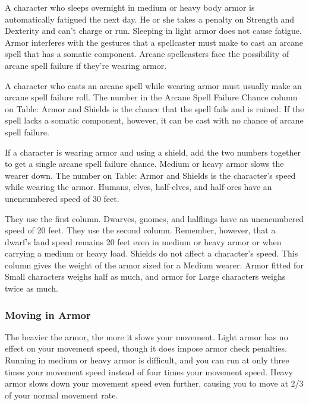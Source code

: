  A character who sleeps overnight in medium or heavy body armor is automatically fatigued the next day. He or she takes a  penalty on Strength and Dexterity and can't charge or run. Sleeping in light armor does not cause fatigue.
 Armor interferes with the gestures that a spellcaster must make to cast an arcane spell that has a somatic component. Arcane spellcasters face the possibility of arcane spell failure if they're wearing armor.

 A character who casts an arcane spell while wearing armor must usually make an arcane spell failure roll. The number in the Arcane Spell Failure Chance column on Table: Armor and Shields is the chance that the spell fails and is ruined. If the spell lacks a somatic component, however, it can be cast with no chance of arcane spell failure.

 If a character is wearing armor and using a shield, add the two numbers together to get a single arcane spell failure chance.
 Medium or heavy armor slows the wearer down. The number on Table: Armor and Shields is the character's speed while wearing the armor. Humans, elves, half-elves, and half-orcs have an unencumbered speed of 30 feet.
\par They use the first column. Dwarves, gnomes, and halflings have an unencumbered speed of 20 feet. They use the second column. Remember, however, that a dwarf's land speed remains 20 feet even in medium or heavy armor or when carrying a medium or heavy load.
 Shields do not affect a character's speed.
 This column gives the weight of the armor sized for a Medium wearer. Armor fitted for Small characters weighs half as much, and armor for Large characters weighs twice as much.

\subsubsection{Moving in Armor}
The heavier the armor, the more it slows your movement. Light armor has no effect on your movement speed, though it does impose armor check penalties. Running in medium or heavy armor is difficult, and you can run at only three times your movement speed instead of four times your movement speed. Heavy armor slows down your movement speed even further, causing you to move at 2/3 of your normal movement rate.

